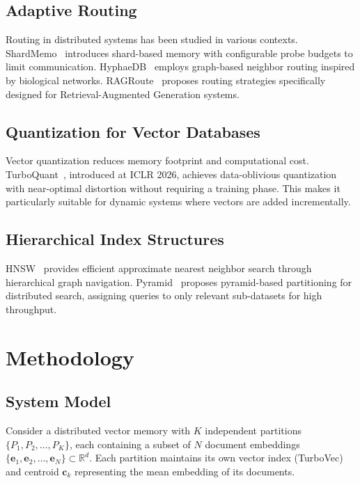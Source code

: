 \documentclass[10pt,twocolumn]{article}
\begin{document}
\subsection{Adaptive Routing}

Routing in distributed systems has been studied in various contexts. ShardMemo~\cite{shardmemo} introduces shard-based memory with configurable probe budgets to limit communication. HyphaeDB~\cite{hyphaedb} employs graph-based neighbor routing inspired by biological networks. RAGRoute~\cite{ragroute} proposes routing strategies specifically designed for Retrieval-Augmented Generation systems.

\subsection{Quantization for Vector Databases}

Vector quantization reduces memory footprint and computational cost. TurboQuant~\cite{turboquant}, introduced at ICLR 2026, achieves data-oblivious quantization with near-optimal distortion without requiring a training phase. This makes it particularly suitable for dynamic systems where vectors are added incrementally.

\subsection{Hierarchical Index Structures}

HNSW~\cite{hnsw} provides efficient approximate nearest neighbor search through hierarchical graph navigation. Pyramid~\cite{pyramid} proposes pyramid-based partitioning for distributed search, assigning queries to only relevant sub-datasets for high throughput.

\section{Methodology}

\subsection{System Model}

Consider a distributed vector memory with $K$ independent partitions $\{P_1, P_2, \ldots, P_K\}$, each containing a subset of $N$ document embeddings $\{\mathbf{e}_1, \mathbf{e}_2, \ldots, \mathbf{e}_N\} \subset \mathbb{R}^d$. Each partition maintains its own vector index (TurboVec) and centroid $\mathbf{c}_k$ representing the mean embedding of its documents.
\end{document}
